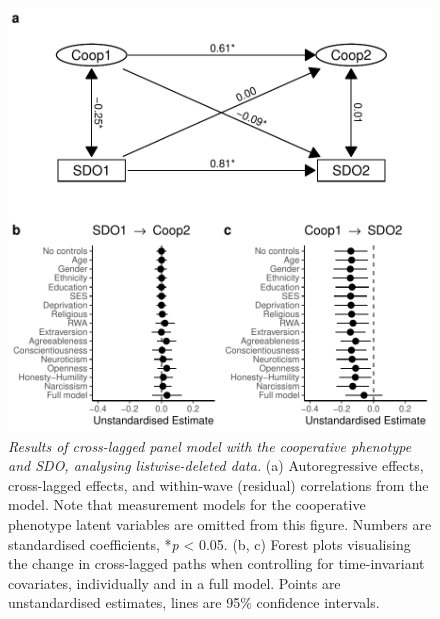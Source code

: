 \documentclass[
  man,floatsintext]{apa6}
\begin{document}
\begin{figure}
\centering
\includegraphics{manuscript_files/figure-latex/clpmPlotBSDO-1.pdf}
\caption{\label{fig:clpmPlotBSDO}\emph{Results of cross-lagged panel model with the
cooperative phenotype and SDO, analysing listwise-deleted data.} (a)
Autoregressive effects, cross-lagged effects, and within-wave (residual)
correlations from the model. Note that measurement models for the cooperative
phenotype latent variables are omitted from this figure. Numbers are
standardised coefficients, *\emph{p} \textless{} 0.05. (b, c) Forest plots visualising the
change in cross-lagged paths when controlling for time-invariant covariates,
individually and in a full model. Points are unstandardised estimates, lines
are 95\% confidence intervals.}
\end{figure}

\newpage
\end{document}
